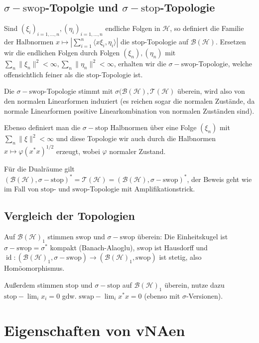 \documentclass[11pt,a4paper]{scrartcl}
\newcommand{\Hc}{\mathcal{H}}
\newcommand{\B}{\mathcal{B}}
\newcommand{\T}{\mathcal{T}}
\theoremstyle{plain}
\theoremstyle{definition}
\theoremstyle{remark}
\DeclareMathOperator{\id}{id}
\begin{document}
\subsection{$\sigma-\mathrm{swop}$-Topolgie und $\sigma-\mathrm{stop}$-Topologie}

Sind $(\xi_i)_{i=1,\dots,n},(\eta_i)_{i=1,\dots,n}$ endliche Folgen in $\Hc$, so definiert die Familie der Halbnormen $x\mapsto |\sum_{i=1}^n \langle x\xi_i, \eta_i \rangle|$ die $\mathrm{stop}$-Topologie auf $\B(\Hc)$. Ersetzen wir die endlichen Folgen durch Folgen $(\xi_n),(\eta_n)$ mit $\sum_n \|\xi_n\|^2 < \infty, \sum_n \|\eta_n\|^2 < \infty$, erhalten wir die $\sigma-\mathrm{swop}$-Topologie, welche offensichtlich feiner als die $\mathrm{stop}$-Topologie ist.

Die $\sigma-\mathrm{swop}$-Topologie stimmt mit $\sigma(\B(\Hc),\T(\Hc)$ überein, wird also von den normalen Linearformen induziert (es reichen sogar die normalen Zustände, da normale Linearformen positive Linearkombination von normalen Zuständen sind).

Ebenso definiert man die $\sigma-\mathrm{stop}$ Halbnormen über eine Folge $(\xi_n)$ mit $\sum_n \|\xi\|^2 < \infty$ und diese Topologie wir auch durch die Halbnormen $x\mapsto \varphi(x^*x)^{1/2}$ erzeugt, wobei $\varphi$ normaler Zustand.

Für die Dualräume gilt $(\B(\Hc),\sigma-\mathrm{stop})^*=\T(\Hc)=(\B(\Hc),\sigma-\mathrm{swop})^*$, der Beweis geht wie im Fall von $\mathrm{stop}$- und $\mathrm{swop}$-Topologie mit Amplifikationstrick.

\subsection{Vergleich der Topologien}

Auf $\B(\Hc)_1$ stimmen $\mathrm{swop}$ und $\sigma-\mathrm{swop}$ überein: Die Einheitskugel ist $\sigma-\mathrm{swop}=\sigma^*$ kompakt (Banach-Alaoglu), $\mathrm{swop}$ ist Hausdorff und $\id: (\B(\Hc)_1, \sigma-\mathrm{swop})\to (\B(\Hc)_1,\mathrm{swop})$ ist stetig, also Homöomorphismus.

Außerdem stimmen $\mathrm{stop}$ und $\sigma-\mathrm{stop}$ auf $\B(\Hc)_1$ überein, nutze dazu $\mathrm{stop}-\lim_i x_i = 0$ gdw. $\mathrm{swap}-\lim_i x^*x = 0$ (ebenso mit $\sigma$-Versionen).

\section{Eigenschaften von vNAen}
\end{document}
